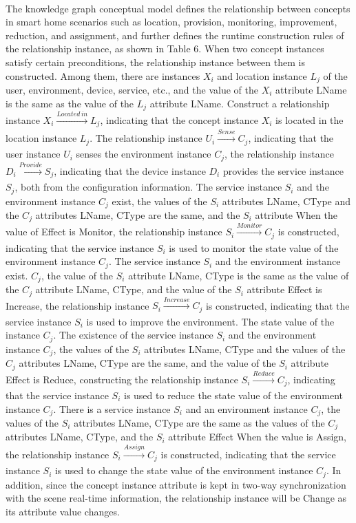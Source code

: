 \paragraph{}
The knowledge graph conceptual model defines the relationship between concepts in smart home scenarios such as location,  provision, monitoring, improvement, reduction, and assignment, and further defines the runtime construction rules of the relationship instance, as shown in Table 6. When two concept instances satisfy certain preconditions, the relationship instance between them is constructed. Among them, there are instances $X_{i}$ and location instance $L_{j}$ of the user, environment, device, service, etc., and the value of the $X_{i}$ attribute LName is the same as the value of the $L_{j}$ attribute LName. Construct a relationship instance $X_{i}\xrightarrow[]{Located\,in}L_{j}$, indicating that the concept instance $X_{i}$ is located in the location instance $L_{j}$. The relationship instance $U_{i}\xrightarrow[]{Sense} C_{j}$, indicating that the user instance $U_{i}$ senses the environment instance $C_{j}$, the relationship instance $D_{i}\xrightarrow[]{Provide}S_{j}$, indicating that the device instance $D_{i}$ provides the service instance $S_{j}$, both from the configuration information. The service instance $S_{i}$ and the environment instance $C_{j}$ exist, the values of the $S_{i}$ attributes LName, CType and the $C_{j}$ attributes LName, CType are the same, and the $S_{i}$ attribute When the value of Effect is Monitor, the relationship instance $S_{i}\xrightarrow[]{Monitor}C_{j}$ is constructed, indicating that the service instance $S_{i}$ is used to monitor the state value of the environment instance $C_{j}$. The service instance $S_{i}$ and the environment instance exist. $C_{j}$, the value of the $S_{i}$ attribute LName, CType is the same as the value of the $C_{j}$ attribute LName, CType, and the value of the $S_{i}$ attribute Effect is Increase, the relationship instance $S_{i}\xrightarrow[]{Increase}C_{j}$ is constructed, indicating that the service instance $S_{i}$ is used to improve the environment. The state value of the instance $C_{j}$. The existence of the service instance $S_{i}$ and the environment instance $C_{j}$, the values of the $S_{i}$ attributes LName, CType and the values of the $C_{j}$ attributes LName, CType are the same, and the value of the $S_{i}$ attribute Effect is Reduce, constructing the relationship instance $S_{i}\xrightarrow[]{Reduce}C_{j}$, indicating that the service instance $S_{i}$ is used to reduce the state value of the environment instance $C_{j}$. There is a service instance $S_{i}$ and an environment instance $C_{j}$, the values of the $S_{i}$ attributes LName, CType are the same as the values of the $C_{j}$ attributes LName, CType, and the $S_{i}$ attribute Effect When the value is Assign, the relationship instance $S_{i}\xrightarrow[]{Assign}C_{j}$ is constructed, indicating that the service instance $S_{i}$ is used to change the state value of the environment instance $C_{j}$. In addition, since the concept instance attribute is kept in two-way synchronization with the scene real-time information, the relationship instance will be Change as its attribute value changes.

